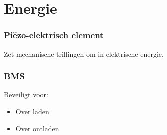 \section{Energie}
    \begin{frame}
        \frametitle{Piëzo-elektrisch element}
    
        Zet mechanische trillingen om in elektrische energie.
    
    \end{frame}
    \begin{frame}
        \frametitle{BMS}
    
        Beveiligt voor:
        \begin{itemize}
            \item Over laden
            \item Over ontladen
        \end{itemize}
    
    \end{frame}
    
        
    
